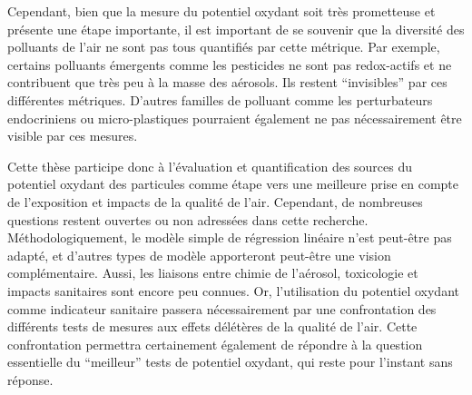 Cependant, bien que la mesure du potentiel oxydant soit très prometteuse et présente une
étape importante, il est important de se souvenir que la diversité des polluants de l'air
ne sont pas tous quantifiés par cette métrique.  Par exemple, certains polluants
émergents comme les pesticides ne sont pas redox-actifs et ne contribuent que très peu à
la masse des aérosols. Ils restent ``invisibles'' par ces différentes métriques. D'autres
familles de polluant comme les perturbateurs endocriniens ou micro-plastiques pourraient
également ne pas nécessairement être visible par ces mesures.

Cette thèse participe donc à l'évaluation et quantification des sources
du potentiel oxydant des particules comme étape vers une meilleure prise en compte de
l'exposition et impacts de la qualité de l'air. Cependant, de nombreuses questions restent
ouvertes ou non adressées dans cette recherche. Méthodologiquement, le modèle simple de
régression linéaire n'est peut-être pas adapté, et d'autres types de modèle apporteront
peut-être une vision complémentaire. Aussi, les liaisons entre chimie de l'aérosol,
toxicologie et impacts sanitaires sont encore peu connues. Or, l'utilisation du potentiel
oxydant comme indicateur sanitaire passera nécessairement par une confrontation des
différents tests de mesures aux effets délétères de la qualité de l'air. Cette
confrontation permettra certainement également de répondre à la question essentielle du
``meilleur'' tests de potentiel oxydant, qui reste pour l'instant sans réponse.
